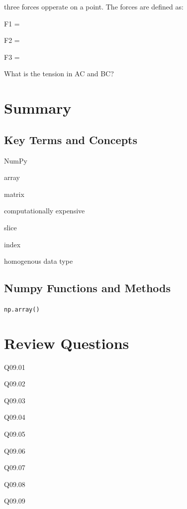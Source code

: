 \documentclass{book}
\newenvironment{problems}{}{}  %
\newenvironment{key_terms}{\begin{multicols}{3}}{\end{multicols}} %
\begin{document}
three forces opperate on a point. The forces are defined as:

F1 =

F2 =

F3 =

What is the tension in AC and BC?
    




    
        \newpage
        \section{Summary}\label{summary}

    




    
        \subsection{Key Terms and Concepts}\label{key-terms-and-concepts}
    




    
        \begin{key_terms}
        NumPy

array

matrix

computationally expensive

slice

index

homogenous data type
        \end{key_terms}

    




    
        \subsection{Numpy Functions and
Methods}\label{numpy-functions-and-methods}

\lstinline!np.array()!
    




    
        \section{Review Questions}\label{review-questions}
    




    
        \begin{problems}
        Q09.01

Q09.02

Q09.03

Q09.04

Q09.05

Q09.06

Q09.07

Q09.08

Q09.09
        \end{problems}
\end{document}
